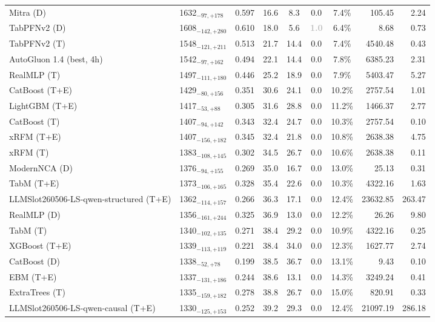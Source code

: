 \begin{tabular}{llcccccrr}
Mitra (D) & 1632${}_{-97,+178}$ & 0.597 & 16.6 & 8.3 & 0.0 & 7.4\% & 105.45 & 2.24 \\
TabPFNv2 (D) & 1608${}_{-142,+280}$ & 0.610 & 18.0 & 5.6 & \textcolor{silver}{\textbf{1.0}} & 6.4\% & 8.68 & 0.73 \\
TabPFNv2 (T) & 1548${}_{-121,+211}$ & 0.513 & 21.7 & 14.4 & 0.0 & 7.4\% & 4540.48 & 0.43 \\
AutoGluon 1.4 (best, 4h) & 1542${}_{-97,+162}$ & 0.494 & 22.1 & 14.4 & 0.0 & 7.8\% & 6385.23 & 2.31 \\
RealMLP (T) & 1497${}_{-111,+180}$ & 0.446 & 25.2 & 18.9 & 0.0 & 7.9\% & 5403.47 & 5.27 \\
CatBoost (T+E) & 1429${}_{-80,+156}$ & 0.351 & 30.6 & 24.1 & 0.0 & 10.2\% & 2757.54 & 1.01 \\
LightGBM (T+E) & 1417${}_{-53,+88}$ & 0.305 & 31.6 & 28.8 & 0.0 & 11.2\% & 1466.37 & 2.77 \\
CatBoost (T) & 1407${}_{-94,+142}$ & 0.343 & 32.4 & 24.7 & 0.0 & 10.3\% & 2757.54 & 0.10 \\
xRFM (T+E) & 1407${}_{-156,+182}$ & 0.345 & 32.4 & 21.8 & 0.0 & 10.8\% & 2638.38 & 4.75 \\
xRFM (T) & 1383${}_{-108,+145}$ & 0.302 & 34.5 & 26.7 & 0.0 & 10.6\% & 2638.38 & 0.11 \\
ModernNCA (D) & 1376${}_{-94,+155}$ & 0.269 & 35.0 & 16.7 & 0.0 & 13.0\% & 25.13 & 0.31 \\
TabM (T+E) & 1373${}_{-106,+165}$ & 0.328 & 35.4 & 22.6 & 0.0 & 10.3\% & 4322.16 & 1.63 \\
LLMSlot260506-LS-qwen-structured (T+E) & 1362${}_{-114,+157}$ & 0.266 & 36.3 & 17.1 & 0.0 & 12.4\% & 23632.85 & 263.47 \\
RealMLP (D) & 1356${}_{-161,+244}$ & 0.325 & 36.9 & 13.0 & 0.0 & 12.2\% & 26.26 & 9.80 \\
TabM (T) & 1340${}_{-102,+135}$ & 0.271 & 38.4 & 29.2 & 0.0 & 10.9\% & 4322.16 & 0.25 \\
XGBoost (T+E) & 1339${}_{-113,+119}$ & 0.221 & 38.4 & 34.0 & 0.0 & 12.3\% & 1627.77 & 2.74 \\
CatBoost (D) & 1338${}_{-52,+78}$ & 0.199 & 38.5 & 36.7 & 0.0 & 13.1\% & 9.43 & 0.10 \\
EBM (T+E) & 1337${}_{-131,+186}$ & 0.244 & 38.6 & 13.1 & 0.0 & 14.3\% & 3249.24 & 0.41 \\
ExtraTrees (T) & 1335${}_{-159,+182}$ & 0.278 & 38.8 & 26.7 & 0.0 & 15.0\% & 820.91 & 0.33 \\
LLMSlot260506-LS-qwen-causal (T+E) & 1330${}_{-125,+153}$ & 0.252 & 39.2 & 29.3 & 0.0 & 12.4\% & 21097.19 & 286.18 \\

\end{tabular}
